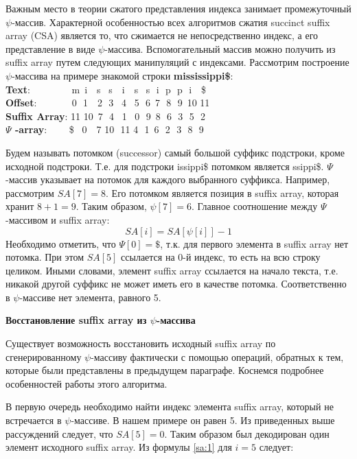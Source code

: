 Важным место в теории сжатого представления индекса занимает промежуточный $\psi$-массив.
Характерной особенностью всех алгоритмов сжатия succinct suffix array (CSA)
является то, что сжимается не непосредственно индекс, а его представление
в виде $\psi$-массива. Вспомогательный массив можно получить из suffix array путем следующих манипуляций с индексами.
\newpage
Рассмотрим построение $\psi$-массива на примере знакомой строки \textbf{mississippi\$}:
\\ \textbf{Text}:\,\,\,\,\,\,\,\,\,\,\,\,\,\,\,\,\,\,\,\,\,\,\,\, m \,i \,\,\,\,s \,\,\,s \,\,\,\,i \,\,\,\,s \,\,\,s \,\,i \,\,p \,\,p \,\,i \,\,\,\,\$
\\ \textbf{Offset}:\,\,\,\,\,\,\,\,\,\,\,\,\,\,\,\,\,\,\,\, 0 \,\,1 \,\,\,\,2 \,\,3 \,\,\,4 \,\,\,5 \,\,6 \,7 \,\,8 \,\,9 \,10 11
\\ \textbf{Suffix Array}:   11 10 \,7 \,\,4 \,\,\,1 \,\,\,0 \,\,9 \,8 \,\,6 \,\,3 \,\,5 \,\,2
\\ \textbf{$\Psi$ -array}: \,\,\,\,\,\,\,\,\,\,\,\,\$ \,\,\,0 \,\,\,\,7 10 \,\,11 4 \,\,1 \,6 \,\,2 \,\,3 \,\,8 \,\,9

Будем называть потомком (successor) самый большой суффикс подстроки, кроме исходной подстроки.
Т.е. для подстроки issippi\$ потомком является ssippi\$.
$\Psi$-массив указывает на потомок для каждого выбранного суффикса.
Например, рассмотрим $SA[7] = 8$. Его потомком является позиция в suffix array, которая хранит $8 + 1 = 9$.
Таким образом, $\psi[7] = 6$. Главное соотношение между $\Psi$-массивом и suffix array:
\begin{equation}\label{sa:1}
 SA[i] = SA[\psi[i]] - 1
\end{equation}
Необходимо отметить, что $\Psi[0] = \$$, т.к. для первого элемента в suffix array нет потомка.
При этом $SA[5]$ ссылается на 0-й индекс, то есть на всю строку целиком.
Иными словами, элемент suffix array ссылается на начало текста,
т.е. никакой другой суффикс не может иметь его в качестве потомка.
Соответственно в $\psi$-массиве нет элемента, равного 5.

\textbf{Восстановление suffix array из $\psi$-массива}

Существует возможность восстановить исходный suffix array по сгенерированному $\psi$-массиву
фактически с помощью операций, обратных к тем, которые были представлены в предыдущем параграфе.
Коснемся подробнее особенностей работы этого алгоритма.

В первую очередь необходимо найти индекс элемента suffix array, который не встречается в $\psi$-массиве.
В нашем примере он равен 5. Из приведенных выше рассуждений следует, что $SA[5] = 0$.
Таким образом был декодирован один элемент исходного suffix array. Из формулы \ref{sa:1} для $i = 5$ следует:

